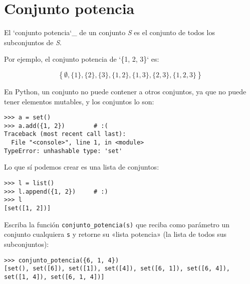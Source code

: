 \section{Conjunto potencia}

El `conjunto potencia`\_ de un conjunto \emph{S} es el conjunto de todos
los subconjuntos de \emph{S}.

Por ejemplo, el conjunto potencia de `\{1, 2, 3\}` es:

\[\left\{
\emptyset,
\{1\},
\{2\},
\{3\},
\{1, 2\},
\{1, 3\},
\{2, 3\},
\{1, 2, 3\}
\right\}\]

En Python, un conjunto no puede contener a otros conjuntos, ya que no
puede tener elementos mutables, y los conjuntos lo son:

\begin{lstlisting}
>>> a = set()
>>> a.add({1, 2})        # :(
Traceback (most recent call last):
  File "<console>", line 1, in <module>
TypeError: unhashable type: 'set'
\end{lstlisting}

Lo que sí podemos crear es una lista de conjuntos:

\begin{lstlisting}
>>> l = list()
>>> l.append({1, 2})     # :)
>>> l
[set([1, 2])]
\end{lstlisting}

Escriba la función \lstinline!conjunto_potencia(s)! que reciba como
parámetro un conjunto cualquiera \lstinline!s! y retorne su «lista
potencia» (la lista de todos sus subconjuntos):

\begin{lstlisting}
>>> conjunto_potencia({6, 1, 4})
[set(), set([6]), set([1]), set([4]), set([6, 1]), set([6, 4]), set([1, 4]), set([6, 1, 4])]
\end{lstlisting}

